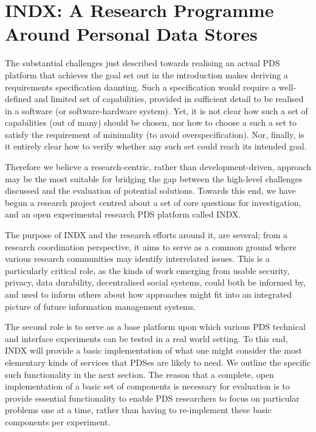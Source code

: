 \documentclass[runningheads,a4paper]{llncs}
\begin{document}
\section{INDX: A Research Programme Around Personal Data Stores}

The substantial challenges just described towards realising an actual PDS platform that achieves the goal set out in the introduction makes deriving a requirements specification daunting.  Such a specification would require a well-defined and limited set of capabilities, provided in sufficient detail to be realised in a software (or software-hardware system).  Yet, it is not clear how such a set of capabilities (out of many) should be chosen, nor how to choose a such a set to satisfy the requirement of minimality (to avoid overspecification).  Nor, finally, is it entirely clear how to verify whether any such set could reach its intended goal.

Therefore we believe a research-centric, rather than development-driven, approach may be the most suitable for bridging the gap between the high-level challenges discussed and the evaluation of potential solutions.  Towards this end, we have begun a research project centred about a set of core questions for investigation, and an open experimental research PDS platform called INDX.

The purpose of INDX and the research efforts around it, are several; from a research coordination perspective, it aims to serve as a common ground where various research communities may identify interrelated issues.  This is a particularly critical role, as the kinds of work emerging from usable security, privacy, data durability, decentralised social systems, could both be informed by, and used to inform others about how approaches might fit into an integrated picture of future information management systems.

The second role is to serve as a base platform upon which various PDS technical and interface experiments can be tested in a real world setting.  To this end, INDX will provide a basic implementation of what one might consider the most elementary kinds of services that PDSes are likely to need.  We outline the specific such functionality in the next section.  The reason that a complete, open implementation of a basic set of components is necessary for evaluation is to provide essential functionality to enable PDS researchers to focus on particular problems one at a time, rather than having to re-implement these basic components per experiment.  
\end{document}
